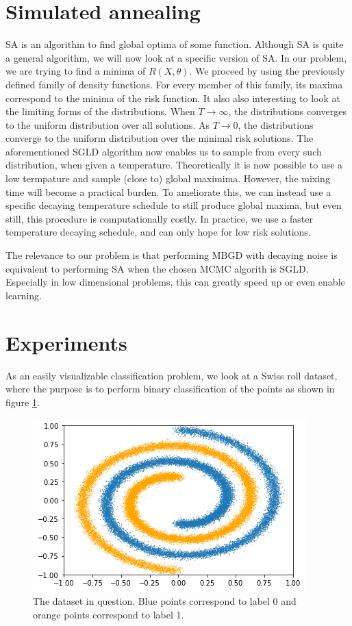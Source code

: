 \documentclass[twocolumn]{article}
\begin{document}
\section{Simulated annealing}
SA is an algorithm to find global optima of some function. Although SA is quite a general algorithm, we will now look at a specific version of SA. In our problem, we are trying to find a minima of $R(X, \theta)$. We proceed by using the previously defined family of density functions. For every member of this family, its maxima correspond to the minima of the risk function. It also also interesting to look at the limiting forms of the distributions. When $T\rightarrow \infty$, the distributions converges to the uniform distribution over all solutions. As $T \rightarrow 0$, the distributions converge to the uniform distribution over the minimal risk solutions. The aforementioned SGLD algorithm now enables us to sample from every such distribution, when given a temperature. Theoretically it is now possible to use a low termpature and sample (close to) global maximima. However, the mixing time will become a practical burden. To ameliorate this, we can instead use a specific decaying temperature schedule to still produce global maxima, but even still, this procedure is computationally costly. In practice, we use a faster temperature decaying schedule, and can only hope for low risk solutions.

The relevance to our problem is that performing MBGD with decaying noise is equivalent to performing SA when the chosen MCMC algorith is SGLD. Especially in low dimensional problems, this can greatly speed up or even enable learning.

\section{Experiments}
As an easily visualizable classification problem, we look at a Swiss roll dataset, where the purpose is to perform binary classification of the points as shown in figure \ref{swiss_roll}.
\begin{figure}[ht!]
\begin{center}
  \centerline{\includegraphics[width=\columnwidth]{src/swiss_roll.png}}
\caption{The dataset in question. Blue points correspond to label 0 and orange points correspond to label 1.}
\label{swiss_roll}
\end{center}
\vskip -0.2in
\end{figure}
\end{document}

